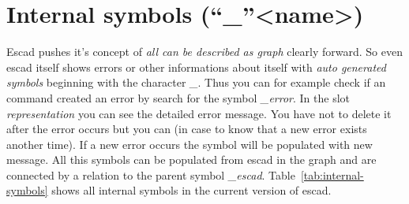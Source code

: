 \documentclass[a4paper, 12pt, openany]{scrbook}
\begin{document}
\section{Internal symbols (``\_''<name>)}
Escad pushes it's concept of \emph{all can be described as graph} clearly forward. So even escad itself shows errors or other informations about itself with \emph{auto generated symbols} beginning with the character \emph{\_}. Thus you can for example check if an command created an error by search for the symbol \emph{\_error}. In the slot \emph{representation} you can see the detailed error message. You have not to delete it after the error occurs but you can (in case to know that a new error exists another time). If a new error occurs the symbol will be populated with new message. All this symbols can be populated from escad in the graph and are connected by a relation to the parent symbol \emph{\_escad}.
Table~\ref{tab:internal-symbols} shows all internal symbols in the current version of escad.
\end{document}
